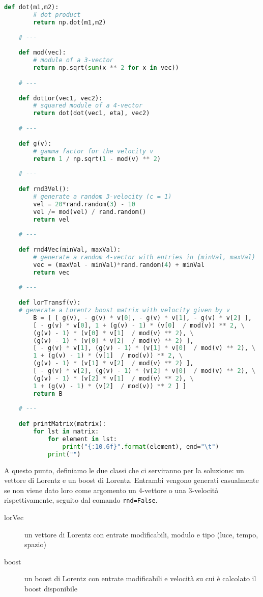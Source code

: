 \documentclass[12pt,notitlepage]{report}
\begin{document}
\begin{lstlisting}[language=Python]
	def dot(m1,m2):
		# dot product
		return np.dot(m1,m2)
	
	# ---
	
	def mod(vec):
		# module of a 3-vector
		return np.sqrt(sum(x ** 2 for x in vec))
	
	# ---
	
	def dotLor(vec1, vec2):
		# squared module of a 4-vector
		return dot(dot(vec1, eta), vec2)
	
	# ---
	
	def g(v):
		# gamma factor for the velocity v
		return 1 / np.sqrt(1 - mod(v) ** 2)
	
	# ---
	
	def rnd3Vel():
		# generate a random 3-velocity (c = 1)
		vel = 20*rand.random(3) - 10
		vel /= mod(vel) / rand.random()
		return vel
	
	# ---
	
	def rnd4Vec(minVal, maxVal):
		# generate a random 4-vector with entries in (minVal, maxVal)
		vec = (maxVal - minVal)*rand.random(4) + minVal
		return vec
	
	# ---
	
	def lorTransf(v):
	# generate a Lorentz boost matrix with velocity given by v
		B = [ [ g(v), - g(v) * v[0], - g(v) * v[1], - g(v) * v[2] ],
		[ - g(v) * v[0], 1 + (g(v) - 1) * (v[0]  / mod(v)) ** 2, \
		(g(v) - 1) * (v[0] * v[1]  / mod(v) ** 2), \
		(g(v) - 1) * (v[0] * v[2]  / mod(v) ** 2) ],
		[ - g(v) * v[1], (g(v) - 1) * (v[1] * v[0]  / mod(v) ** 2), \
		1 + (g(v) - 1) * (v[1]  / mod(v)) ** 2, \
		(g(v) - 1) * (v[1] * v[2]  / mod(v) ** 2) ],
		[ - g(v) * v[2], (g(v) - 1) * (v[2] * v[0]  / mod(v) ** 2), \
		(g(v) - 1) * (v[2] * v[1]  / mod(v) ** 2), \
		1 + (g(v) - 1) * (v[2]  / mod(v)) ** 2 ] ]
		return B
	
	# ---
	
	def printMatrix(matrix):
		for lst in matrix:
			for element in lst:
				print("{:10.6f}".format(element), end="\t")
			print("")
\end{lstlisting}

A questo punto, definiamo le due classi che ci serviranno per la soluzione: un vettore di Lorentz e un boost di Lorentz. Entrambi vengono generati casualmente se non viene dato loro come argomento un 4-vettore o una 3-velocità rispettivamente, seguito dal comando \lstinline|rnd=False|.

\begin{description}
	\item[lorVec] un vettore di Lorentz con entrate modificabili, modulo e tipo (luce, tempo, spazio)
	
	\item[boost] un boost di Lorentz con entrate modificabili e velocità su cui è calcolato il boost disponibile
\end{description}
\end{document}
